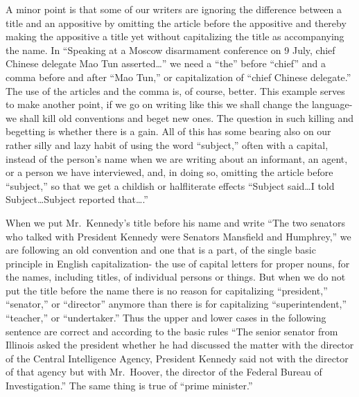 \documentclass[
    oneside,
    11pt,
]{memoir}
\begin{document}
A minor point is that some of our writers are ignoring the difference between a title and an appositive by omitting the article before the appositive and thereby making the appositive a title yet without capitalizing the title as accompanying the name. In \enquote{Speaking at a Moscow disarmament conference on 9 July, chief Chinese delegate Mao Tun asserted\dots} we need a \enquote{the} before \enquote{chief} and a comma before and after \enquote{Mao Tun,} or capitalization of \enquote{chief Chinese delegate.} The use of the articles and the comma is, of course, better. This example serves to make another point, if we go on writing like this we shall change the language-we shall kill old conventions and beget new ones. The question in such killing and begetting is whether there is a gain. All of this has some bearing also on our rather silly and lazy habit of using the word \enquote{subject,} often with a capital, instead of the person's name when we are writing about an informant, an agent, or a person we have interviewed, and, in doing so, omitting the article before \enquote{subject,} so that we get a childish or halfliterate effects \enquote{Subject said\dots I told Subject\dots Subject reported that\dots.} 

When we put Mr.\ Kennedy's title before his name and write \enquote{The two senators who talked with President Kennedy were Senators Mansfield and Humphrey,} we are following an old convention and one that is a part, of the single basic principle in English capitalization- the use of capital letters for proper nouns, for the names, including titles, of individual persons or things. But when we do not put the title before the name there is no reason for capitalizing \enquote{president,} \enquote{senator,} or \enquote{director} anymore than there is for capitalizing \enquote{superintendent,} \enquote{teacher,} or \enquote{undertaker.} Thus the upper and lower cases in the following sentence are correct and according to the basic rules \enquote{The senior senator from Illinois asked the president whether he had discussed the matter with the director of the Central Intelligence Agency, President Kennedy said not with the director of that agency but with Mr.\ Hoover, the director of the Federal Bureau of Investigation.} The same thing is true of \enquote{prime minister.} 
\end{document}
